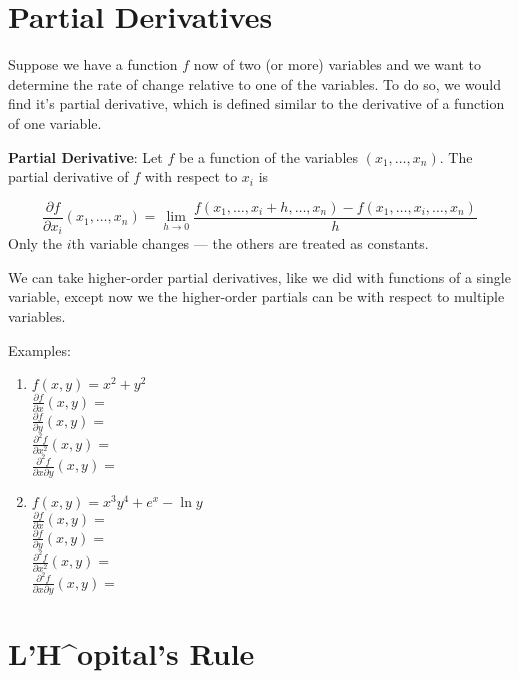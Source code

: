\documentclass[]{book}
\theoremstyle{definition}
\theoremstyle{definition}
\theoremstyle{definition}
\theoremstyle{remark}
\begin{document}
\section{Partial Derivatives}\label{partial-derivatives}

Suppose we have a function \(f\) now of two (or more) variables and we
want to determine the rate of change relative to one of the variables.
To do so, we would find it's partial derivative, which is defined
similar to the derivative of a function of one variable.

\textbf{Partial Derivative}: Let \(f\) be a function of the variables
\((x_1,\ldots,x_n)\). The partial derivative of \(f\) with respect to
\(x_i\) is

\[\frac{\partial f}{\partial x_i} (x_1,\ldots,x_n) = \lim\limits_{h\to 0} \frac{f(x_1,\ldots,x_i+h,\ldots,x_n)-f(x_1,\ldots,x_i,\ldots,x_n)}{h}\]
Only the \(i\)th variable changes --- the others are treated as
constants.

We can take higher-order partial derivatives, like we did with functions
of a single variable, except now we the higher-order partials can be
with respect to multiple variables.

\begin{framed}
Examples:
\begin{enumerate}
        \item $f(x,y)=x^2+y^2$\\
            $\frac{\partial f}{\partial x}(x,y)=$\\
            $\frac{\partial f}{\partial y}(x,y)=$\\
            $\frac{\partial^2 f}{\partial x^2}(x,y)=$\\
            $\frac{\partial^2 f}{\partial x \partial y}(x,y)=$
        \item $f(x,y)=x^3 y^4 +e^x -\ln y$\\
            $\frac{\partial f}{\partial x}(x,y)=$\\
            $\frac{\partial f}{\partial y}(x,y)=$\\
            $\frac{\partial^2 f}{\partial x^2}(x,y)=$\\
            $\frac{\partial^2 f}{\partial x \partial y}(x,y)=$
    \end{enumerate}
\end{framed}

\section{L'H\^{}opital's Rule}\label{lhopitals-rule}
\end{document}
